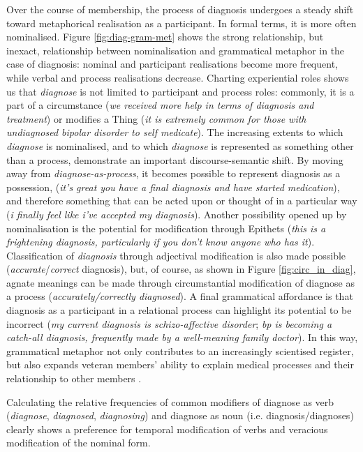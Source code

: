 Over the course of membership, the process of diagnosis undergoes a steady shift toward metaphorical realisation as a participant. In formal terms, it is more often nominalised. Figure \ref{fig:diag-gram-met} shows the strong relationship, but inexact, relationship between nominalisation and grammatical metaphor in the case of diagnosis: nominal and participant realisations become more frequent, while verbal and process realisations decrease. Charting experiential roles shows us that \emph{diagnose} is not limited to participant and process roles: commonly, it is a part of a circumstance (\emph{we received more help in terms of diagnosis and treatment}) or modifies a Thing (\emph{it is extremely common for those with undiagnosed bipolar disorder to self medicate}). The increasing extents to which \emph{diagnose} is nominalised, and to which \emph{diagnose} is represented as something other than a process, demonstrate an important discourse-semantic shift. By moving away from \emph{diagnose\hyp{}as\hyp{}process}, it becomes possible to represent diagnosis as a possession, (\emph{it's great you have a final diagnosis and have started medication}), and therefore something that can be acted upon or thought of in a particular way (\emph{i finally feel like i've accepted my diagnosis}). Another possibility opened up by nominalisation is the potential for modification through Epithets (\emph{this is a frightening diagnosis, particularly if you don't know anyone who has it}). Classification of \emph{diagnosis} through adjectival modification is also made possible (\emph{accurate}\slash \emph{correct} diagnosis), but, of course, as shown in Figure \ref{fig:circ_in_diag}, agnate meanings can be made through circumstantial modification of diagnose as a process (\emph{accurately\slash correctly diagnosed}). A final grammatical affordance is that diagnosis as a participant in a relational process can highlight its potential to be incorrect (\emph{my current diagnosis is schizo\hyp{}affective disorder}; \emph{bp is becoming a catch-all diagnosis, frequently made by a well-meaning family doctor}). In this way, grammatical metaphor not only contributes to an increasingly scientised register, but also expands veteran members' ability to explain medical processes and their relationship to other members \cite{heyvaert_nominalization_2003}.

Calculating the relative frequencies of common modifiers of diagnose as verb (\emph{diagnose}, \emph{diagnosed}, \emph{diagnosing}) and diagnose as noun (i.e. diagnosis\slash diagnoses) clearly shows a preference for temporal modification of verbs and veracious modification of the nominal form.

